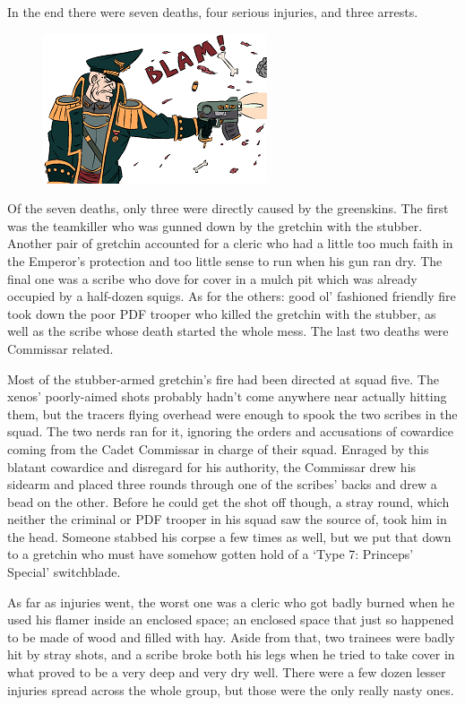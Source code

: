In the end there were seven deaths, four serious injuries, and three arrests.

\begin{figure}
	\begin{center}
		\includegraphics[width=\figwidth]{pics/8/19.png}
	\end{center}
\end{figure}
Of the seven deaths, only three were directly caused by the greenskins. 
The first was the teamkiller who was gunned down by the gretchin with the stubber. 
Another pair of gretchin accounted for a cleric who had a little too much faith in the Emperor’s protection and too little sense to run when his gun ran dry. 
The final one was a scribe who dove for cover in a mulch pit which was already occupied by a half-dozen squigs. 
As for the others: 
good ol’ fashioned friendly fire took down the poor PDF trooper who killed the gretchin with the stubber, as well as the scribe whose death started the whole mess. 
The last two deaths were Commissar related.

Most of the stubber-armed gretchin’s fire had been directed at squad five. 
The xenos’ poorly-aimed shots probably hadn’t come anywhere near actually hitting them, but the tracers flying overhead were enough to spook the two scribes in the squad. 
The two nerds ran for it, ignoring the orders and accusations of cowardice coming from the Cadet Commissar in charge of their squad. 
Enraged by this blatant cowardice and disregard for his authority, the Commissar drew his sidearm and placed three rounds through one of the scribes’ backs and drew a bead on the other. 
Before he could get the shot off though, a stray round, which neither the criminal or PDF trooper in his squad saw the source of, took him in the head. 
Someone stabbed his corpse a few times as well, but we put that down to a gretchin who must have somehow gotten hold of a ‘Type 7: 
Princeps’ Special’ switchblade.

As far as injuries went, the worst one was a cleric who got badly burned when he used his flamer inside an enclosed space; 
an enclosed space that just so happened to be made of wood and filled with hay. 
Aside from that, two trainees were badly hit by stray shots, and a scribe broke both his legs when he tried to take cover in what proved to be a very deep and very dry well. 
There were a few dozen lesser injuries spread across the whole group, but those were the only really nasty ones. 


